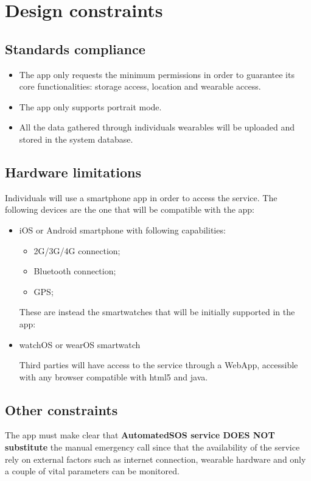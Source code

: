 \section{Design constraints}
\subsection{Standards compliance}
\begin{itemize}
\item The app only requests the minimum permissions in order to guarantee its core functionalities: storage access, location and wearable access.
\item The app only supports portrait mode.
\item All the data gathered through individuals wearables will be uploaded and stored in the system database.
\end{itemize}


\subsection{Hardware limitations}
Individuals will use a smartphone app in order to access the service.
The following devices are the one that will be compatible with the app:
\begin{itemize}
\item iOS or Android smartphone with following capabilities:
\begin{itemize}
\item 2G/3G/4G connection;
\item Bluetooth connection;
\item GPS;
\end{itemize}

These are instead the smartwatches that will be initially supported in the app:
\item watchOS or wearOS smartwatch


Third parties will have access to the service through a WebApp, accessible with any browser compatible with html5 and java.
\end{itemize}

\subsection{Other constraints}
The app must make clear that \textbf{AutomatedSOS service DOES NOT substitute} the manual emergency call since that the availability of the service rely on external factors such as internet connection, wearable hardware and only a couple of vital parameters can be monitored.


